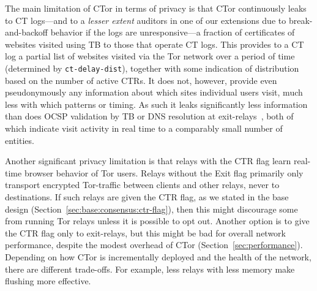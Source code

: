 The main limitation of CTor in terms of privacy is that CTor continuously leaks
to CT logs---and to a \emph{lesser extent} auditors in one of our extensions due
to break-and-backoff behavior if the logs are unresponsive---a fraction of
certificates of websites visited using TB to those that operate CT logs.
This provides
to a CT log a partial list of websites visited via the Tor network over a period
of time (determined by \texttt{ct-delay-dist}), together with some indication of
distribution based on the number of active CTRs. It does not, however, provide
even pseudonymously any information about which sites individual users visit,
much less with which patterns or timing. As such it leaks significantly less
information than does OCSP validation by TB or DNS resolution at
exit-relays~\cite{TorDNS}, both of which indicate visit activity in real time to
a comparably small number of entities.

Another significant privacy limitation is that relays with the CTR flag learn
real-time browser behavior of Tor users. Relays without the Exit flag primarily
only transport encrypted Tor-traffic between clients and other relays, never to
destinations. If such relays are given the CTR flag, as we stated in the base
design (Section~\ref{sec:base:consensus:ctr-flag}), then this might discourage
some from running Tor relays unless it is possible to opt out.  Another option is to give the CTR flag only to
exit-relays, but this might be bad for overall network performance, despite the
modest overhead of CTor (Section~\ref{sec:performance}). Depending on how CTor
is incrementally deployed and the health of the network, there are different
trade-offs. For example, less relays with less memory make flushing more
effective.
